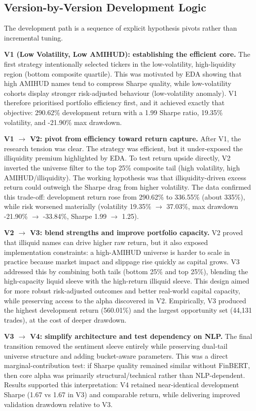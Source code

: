 \documentclass[11pt,twoside,a4paper]{article}
\begin{document}
\subsection*{Version-by-Version Development Logic}
The development path is a sequence of explicit hypothesis pivots rather than incremental tuning.

\textbf{V1 (Low Volatility, Low AMIHUD): establishing the efficient core.}
The first strategy intentionally selected tickers in the low-volatility, high-liquidity region (bottom composite quartile). This was motivated by EDA showing that high AMIHUD names tend to compress Sharpe quality, while low-volatility cohorts display stronger risk-adjusted behaviour (low-volatility anomaly). V1 therefore prioritised portfolio efficiency first, and it achieved exactly that objective: 290.62\% development return with a 1.99 Sharpe ratio, 19.35\% volatility, and -21.90\% max drawdown.

\textbf{V1 \(\rightarrow\) V2: pivot from efficiency toward return capture.}
After V1, the research tension was clear. The strategy was efficient, but it under-exposed the illiquidity premium highlighted by EDA. To test return upside directly, V2 inverted the universe filter to the top 25\% composite tail (high volatility, high AMIHUD/illiquidity). The working hypothesis was that illiquidity-driven excess return could outweigh the Sharpe drag from higher volatility. The data confirmed this trade-off: development return rose from 290.62\% to 336.55\% (about 335\%), while risk worsened materially (volatility 19.35\% \(\rightarrow\) 37.03\%, max drawdown -21.90\% \(\rightarrow\) -33.84\%, Sharpe 1.99 \(\rightarrow\) 1.25).

\textbf{V2 \(\rightarrow\) V3: blend strengths and improve portfolio capacity.}
V2 proved that illiquid names can drive higher raw return, but it also exposed implementation constraints: a high-AMIHUD universe is harder to scale in practice because market impact and slippage rise quickly as capital grows. V3 addressed this by combining both tails (bottom 25\% and top 25\%), blending the high-capacity liquid sleeve with the high-return illiquid sleeve. This design aimed for more robust risk-adjusted outcomes and better real-world capital capacity, while preserving access to the alpha discovered in V2. Empirically, V3 produced the highest development return (560.01\%) and the largest opportunity set (44,131 trades), at the cost of deeper drawdown.

\textbf{V3 \(\rightarrow\) V4: simplify architecture and test dependency on NLP.}
The final transition removed the sentiment sleeve entirely while preserving dual-tail universe structure and adding bucket-aware parameters. This was a direct marginal-contribution test: if Sharpe quality remained similar without FinBERT, then core alpha was primarily structural/technical rather than NLP-dependent. Results supported this interpretation: V4 retained near-identical development Sharpe (1.67 vs 1.67 in V3) and comparable return, while delivering improved validation drawdown relative to V3.
\end{document}
